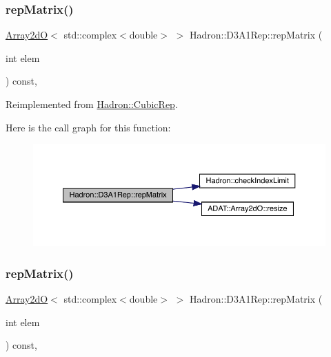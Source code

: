 \subsubsection{\texorpdfstring{repMatrix()}{repMatrix()}\hspace{0.1cm}{\footnotesize\ttfamily [1/2]}}
{\footnotesize\ttfamily \mbox{\hyperlink{classADAT_1_1Array2dO}{Array2dO}}$<$ std\+::complex$<$double$>$ $>$ Hadron\+::\+D3\+A1\+Rep\+::rep\+Matrix (\begin{DoxyParamCaption}\item[{int}]{elem }\end{DoxyParamCaption}) const\hspace{0.3cm}{\ttfamily [inline]}, {\ttfamily [virtual]}}



Reimplemented from \mbox{\hyperlink{structHadron_1_1CubicRep_ac5d7e9e6f4ab1158b5fce3e4ad9e8005}{Hadron\+::\+Cubic\+Rep}}.

Here is the call graph for this function\+:
\nopagebreak
\begin{figure}[H]
\begin{center}
\leavevmode
\includegraphics[width=350pt]{d4/df6/structHadron_1_1D3A1Rep_a618d921105d92d30f7b3c838af644a74_cgraph}
\end{center}
\end{figure}
\mbox{\label{structHadron_1_1D3A1Rep_a618d921105d92d30f7b3c838af644a74}} 
\subsubsection{\texorpdfstring{repMatrix()}{repMatrix()}\hspace{0.1cm}{\footnotesize\ttfamily [2/2]}}
{\footnotesize\ttfamily \mbox{\hyperlink{classADAT_1_1Array2dO}{Array2dO}}$<$ std\+::complex$<$double$>$ $>$ Hadron\+::\+D3\+A1\+Rep\+::rep\+Matrix (\begin{DoxyParamCaption}\item[{int}]{elem }\end{DoxyParamCaption}) const\hspace{0.3cm}{\ttfamily [inline]}, {\ttfamily [virtual]}}



